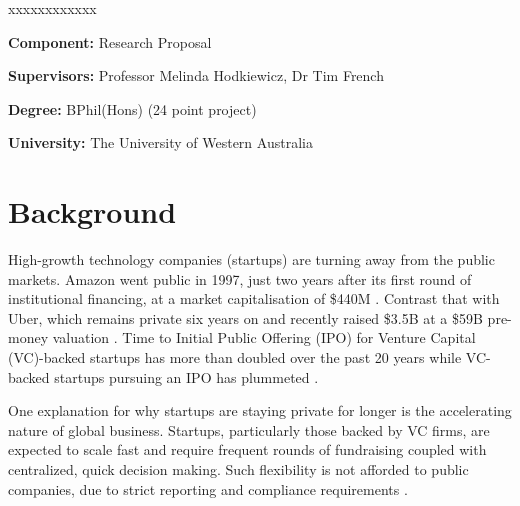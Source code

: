 \documentclass[../thesis/thesis.tex]{subfiles}
\begin{document}

\begin{namelist}{xxxxxxxxxxxx}
\item[{\bf Component:}]
    Research Proposal
\item[{\bf Supervisors:}]
    Professor Melinda Hodkiewicz, Dr Tim French
\item[{\bf Degree:}]
    BPhil(Hons) (24 point project)
\item[{\bf University:}]
    The University of Western Australia
\end{namelist}

\section*{Background}

High-growth technology companies (startups) are turning away from the public markets. Amazon went public in 1997, just two years after its first round of institutional financing, at a market capitalisation of \$440M \cite{kawamoto1997}. Contrast that with Uber, which remains private six years on and recently raised \$3.5B at a \$59B pre-money valuation \cite{buhr2016}. Time to Initial Public Offering (IPO) for Venture Capital (VC)-backed startups has more than doubled over the past 20 years while VC-backed startups pursuing an IPO has plummeted \cite{nvca2016}.

One explanation for why startups are staying private for longer is the accelerating nature of global business. Startups, particularly those backed by VC firms, are expected to scale fast and require frequent rounds of fundraising coupled with centralized, quick decision making. Such flexibility is not afforded to public companies, due to strict reporting and compliance requirements \cite{wies2015}.
\end{document}
